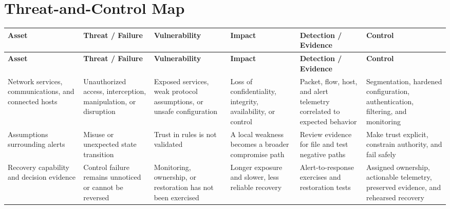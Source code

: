 \documentclass[11pt]{article}
\begin{document}
\section*{Threat-and-Control Map}
\begingroup\scriptsize\setlength{\tabcolsep}{2pt}
\begin{longtable}{>{\RaggedRight\arraybackslash}p{}>{\RaggedRight\arraybackslash}p{}>{\RaggedRight\arraybackslash}p{}>{\RaggedRight\arraybackslash}p{}>{\RaggedRight\arraybackslash}p{}>{\RaggedRight\arraybackslash}p{}}
\toprule\rowcolor{Navy}\color{white}\textbf{Asset} & \color{white}\textbf{Threat / Failure} & \color{white}\textbf{Vulnerability} & \color{white}\textbf{Impact} & \color{white}\textbf{Detection / Evidence} & \color{white}\textbf{Control}\\\midrule
\endfirsthead
\toprule\rowcolor{Navy}\color{white}\textbf{Asset} & \color{white}\textbf{Threat / Failure} & \color{white}\textbf{Vulnerability} & \color{white}\textbf{Impact} & \color{white}\textbf{Detection / Evidence} & \color{white}\textbf{Control}\\\midrule
\endhead
Network services, communications, and connected hosts & Unauthorized access, interception, manipulation, or disruption & Exposed services, weak protocol assumptions, or unsafe configuration & Loss of confidentiality, integrity, availability, or control & Packet, flow, host, and alert telemetry correlated to expected behavior & Segmentation, hardened configuration, authentication, filtering, and monitoring\\\midrule
Assumptions surrounding alerts & Misuse or unexpected state transition & Trust in rules is not validated & A local weakness becomes a broader compromise path & Review evidence for file and test negative paths & Make trust explicit, constrain authority, and fail safely\\\midrule
Recovery capability and decision evidence & Control failure remains unnoticed or cannot be reversed & Monitoring, ownership, or restoration has not been exercised & Longer exposure and slower, less reliable recovery & Alert-to-response exercises and restoration tests & Assigned ownership, actionable telemetry, preserved evidence, and rehearsed recovery\\\midrule
\bottomrule
\end{longtable}
\endgroup
\end{document}
